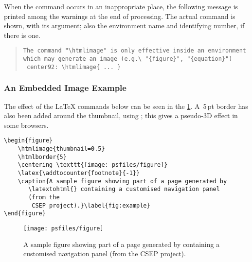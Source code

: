 When the  command occurs in an inappropriate
place, the following message is printed among the warnings
at the end of processing. 
The actual command is shown, with its argument; 
also the environment name and identifying number, if there is one.
%
\begin{quote}
\begin{small}
\begin{verbatim}
The command "\htmlimage" is only effective inside an environment 
which may generate an image (e.g.\ "{figure}", "{equation}")
 center92: \htmlimage{ ... }
\end{verbatim}
\end{small}
\end{quote}


\subsubsection{An Embedded Image Example}%
%
\html{\\}%
The effect of the \LaTeX{}  commands below can be seen in the
 \ref{fig:example}.
A~5\,pt border has also been added around the thumbnail, 
using  ; 
this gives a pseudo-3D effect in some browsers.
\begin{small}
\begin{verbatim}
\begin{figure}
    \htmlimage{thumbnail=0.5}
    \htmlborder{5}
    \centering \texttt{[image: psfiles/figure]}
    \latex{\addtocounter{footnote}{-1}}
    \caption{A sample figure showing part of a page generated by
       \latextohtml{} containing a customised navigation panel 
       (from the 
        CSEP project).}\label{fig:example}
\end{figure}
\end{verbatim}
\end{small}

%
%
%
% 
\begin{figure}[hbt]
    \centering \texttt{[image: psfiles/figure]}
    \latex{\addtocounter{footnote}{-1}}%
    \caption{A sample figure showing part of a page generated by
       \protect\latextohtml{} containing a customised navigation panel 
       (from the 
        CSEP project).}\label{fig:example}
\end{figure}


